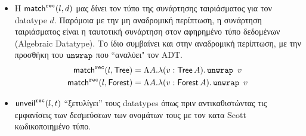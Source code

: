 \begin{itemize}
  \item Η $\mathsf{match}^{\operatorname{\texttt{rec}}}(l, d)$ μας δίνει τον τύπο της συνάρτησης ταιριάσματος για τον datatype $d$. Παρόμοια
  με την μη αναδρομική περίπτωση, η συνάρτηση ταιριάσματος είναι η ταυτοτική  συνάρτηση στον αφηρημένο τύπο δεδομένων (Algebraic Datatype). Το ίδιο συμβαίνει και στην αναδρομική περίπτωση, με την προσθήκη του  $\operatorname{\texttt{unwrap}}$ που ``αναλύει" τον ADT.
    \begin{align*}
    \mathsf{match}^{\operatorname{\texttt{rec}}}(l, \operatorname{\textsf{Tree}}) &= \Lambda A . \lambda (v : \operatorname{\textsf{Tree}} A) . \operatorname{\texttt{unwrap}}\ v\\
    \mathsf{match}^{\operatorname{\texttt{rec}}}(l, \operatorname{\textsf{Forest}}) &= \Lambda A . \lambda (v : \operatorname{\textsf{Forest}} A) . \operatorname{\texttt{unwrap}}\ v
    \end{align*}
  \item $\mathsf{unveil}^{\operatorname{\texttt{rec}}}(l, t)$ ``ξετυλίγει'' τους datatypes όπως πριν αντικαθιστώντας τις
  εμφανίσεις των δεσμεύσεων των ονομάτων τους με τον κατα Scott κωδικοποιημένο τύπο.
\end{itemize}